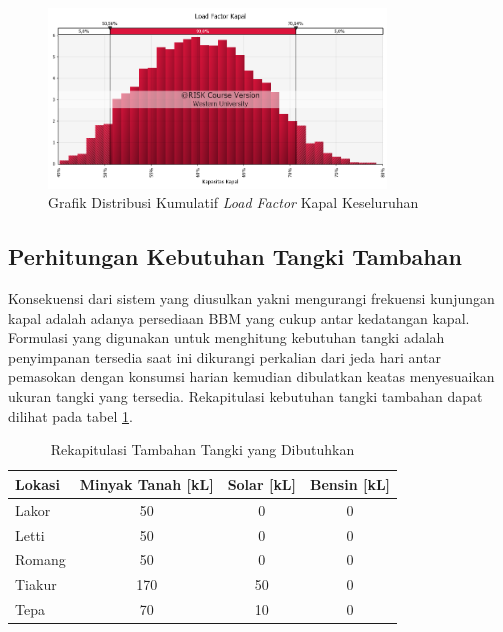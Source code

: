 \begin{figure}[htbp!]
    \centering
    \includegraphics[width=0.8\textwidth]{gambar/loadfactor-ship-overall.png}
    \caption{Grafik Distribusi Kumulatif \emph{Load Factor} Kapal Keseluruhan}
    \label{fig:load-factor-kapal-overall}
\end{figure}


\subsection{Perhitungan Kebutuhan Tangki Tambahan}
\label{subsec:hitungan-tangki}

Konsekuensi dari sistem yang diusulkan yakni mengurangi frekuensi kunjungan kapal adalah adanya persediaan BBM yang cukup antar kedatangan kapal. Formulasi yang digunakan untuk menghitung kebutuhan tangki adalah penyimpanan tersedia saat ini dikurangi perkalian dari jeda hari antar pemasokan dengan konsumsi harian kemudian dibulatkan keatas menyesuaikan ukuran tangki yang tersedia. Rekapitulasi kebutuhan tangki tambahan dapat dilihat pada tabel \ref{rekapitulasi-tambahan-tangki}.

\begin{table}[!htbp]
    \centering
    \caption{Rekapitulasi Tambahan Tangki yang Dibutuhkan}
    \begin{tabular}{|l|c|c|c|}
    \hline
        \textbf{Lokasi} & \textbf{Minyak Tanah [kL]} & \textbf{Solar [kL]} & \textbf{Bensin [kL]} \\ \hline
        Lakor & 50 & 0 & 0 \\ \hline
        Letti & 50 & 0 & 0 \\ \hline
        Romang & 50 & 0 & 0 \\ \hline
        Tiakur & 170 & 50 & 0 \\ \hline
        Tepa & 70 & 10 & 0 \\ \hline
    \end{tabular}
    \label{rekapitulasi-tambahan-tangki}
\end{table}

